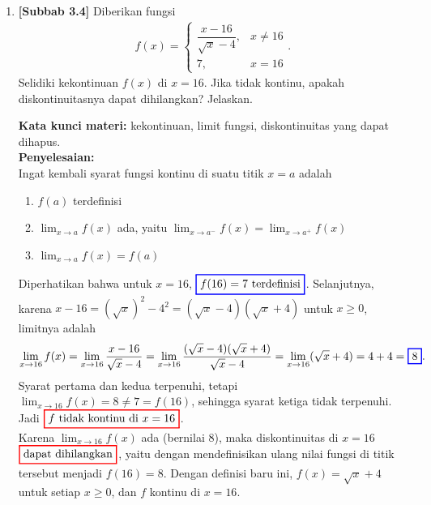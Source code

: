 \documentclass[10pt,openany,a4paper]{article}
\theoremstyle{definition}
\theoremstyle{definition}
\theoremstyle{plain}
\newenvironment{jawab}[2][tes]{%
\par\noindent\textbf{Kata kunci materi:} #1.\\
\textbf{Penyelesaian:} #2%
}{}
\begin{document}
\begin{enumerate}
    \item \textbf{[Subbab 3.4]} Diberikan fungsi
    \begin{align*}
        f(x)=\begin{cases}
            \dfrac{x-16}{\sqrt{x}-4}, & x\neq 16\\
            7, & x=16
        \end{cases}.
    \end{align*}
    Selidiki kekontinuan $f(x)$ di $x=16$. Jika tidak kontinu, apakah diskontinuitasnya dapat dihilangkan? Jelaskan.
    \begin{jawab}[kekontinuan, limit fungsi, diskontinuitas yang dapat dihapus]{~\\
        Ingat kembali syarat fungsi kontinu di suatu titik \(x = a\) adalah
        \begin{enumerate}
            \item \(f(a)\) terdefinisi
            \item \(\displaystyle \lim_{x \to a} f(x)\) ada, yaitu $\displaystyle \lim_{x \to a^-} f(x) = \lim_{x \to a^+} f(x)$
            \item \(\displaystyle\lim_{x \to a} f(x) = f(a)\)
        \end{enumerate}
        Diperhatikan bahwa untuk $x=16$, $\colorlet{oldcolor}{.}
        \color{blue}
        \setlength{\fboxrule}{1pt} \boxed{\color{oldcolor}f(16) = 7~\text{terdefinisi}}\color{oldcolor}$. Selanjutnya, karena $x-16=(\sqrt{x})^2-4^2=(\sqrt{x}-4)(\sqrt{x}+4)$ untuk $x\geq 0$, limitnya adalah
        \begin{align*}
            \lim_{x\to 16} f(x) = \lim_{x\to 16} \frac{x-16}{\sqrt{x}-4} = \lim_{x\to 16} \frac{(\sqrt{x}-4)(\sqrt{x}+4)}{\sqrt{x}-4} = \lim_{x\to 16} (\sqrt{x}+4) = 4+4 = \colorlet{oldcolor}{.}
        \color{blue}
        \setlength{\fboxrule}{1pt} \boxed{\color{oldcolor}8}\color{oldcolor}.
        \end{align*}
        Syarat pertama dan kedua terpenuhi, tetapi $\displaystyle\lim_{x\to 16}f(x)=8\neq 7=f(16)$, sehingga syarat ketiga tidak terpenuhi. Jadi $\colorlet{oldcolor}{.}
        \color{red}
        \setlength{\fboxrule}{1pt} \boxed{\color{oldcolor}f \text{ tidak kontinu di } x=16}\color{oldcolor}$.\\
        Karena $\displaystyle\lim_{x\to 16}f(x)$ ada (bernilai $8$), maka diskontinuitas di $x=16$ $\colorlet{oldcolor}{.}
        \color{red}
        \setlength{\fboxrule}{1pt} \boxed{\color{oldcolor}\text{dapat dihilangkan}}\color{oldcolor}$, yaitu dengan mendefinisikan ulang nilai fungsi di titik tersebut menjadi $f(16)=8$. Dengan definisi baru ini, $f(x)=\sqrt{x}+4$ untuk setiap $x\geq 0$, dan $f$ kontinu di $x=16$.
    }
    \end{jawab}


\end{enumerate}
\end{document}
